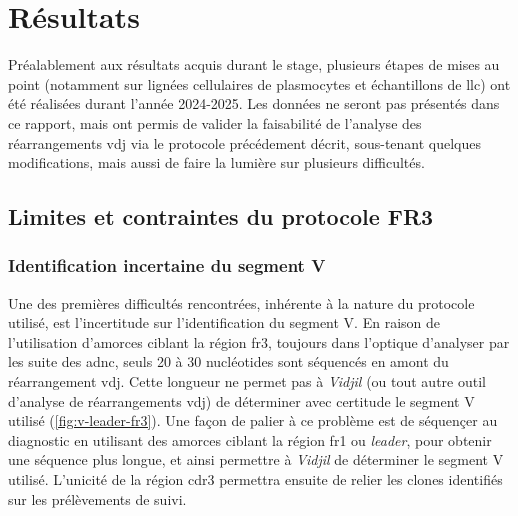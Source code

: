 \chapter{Résultats}

Préalablement aux résultats acquis durant le stage, plusieurs étapes de mises au point (notamment sur lignées cellulaires de plasmocytes et 
échantillons de \gls{llc}) ont été réalisées durant l'année 2024-2025. Les données ne seront pas présentés dans ce rapport, mais ont permis 
de valider la faisabilité de l'analyse des réarrangements \gls{vdj} via le protocole précédement décrit, sous-tenant quelques modifications, 
mais aussi de faire la lumière sur plusieurs difficultés.

\section{Limites et contraintes du protocole FR3}

\subsection{Identification incertaine du segment V}

Une des premières difficultés rencontrées, inhérente à la nature du protocole utilisé, est l'incertitude sur l'identification 
du segment V. En raison de l'utilisation d'amorces ciblant la région \gls{fr}3, toujours dans l'optique d'analyser par les suite 
des \gls{adnc}, seuls 20 à 30 nucléotides sont séquencés en amont du réarrangement \gls{vdj}. Cette longueur ne permet pas à 
\textit{Vidjil} (ou tout autre outil d'analyse de réarrangements \gls{vdj}) de déterminer avec certitude le segment V utilisé 
(\autoref{fig:v-leader-fr3}). 
Une façon de palier à ce problème est de séquençer au diagnostic en utilisant des amorces ciblant la région \gls{fr}1 ou 
\textit{leader}, pour obtenir une séquence plus longue, et ainsi permettre à \textit{Vidjil} de déterminer le segment V utilisé. 
L'unicité de la région \gls{cdr}3 permettra ensuite de relier les clones identifiés sur les prélèvements de suivi.

